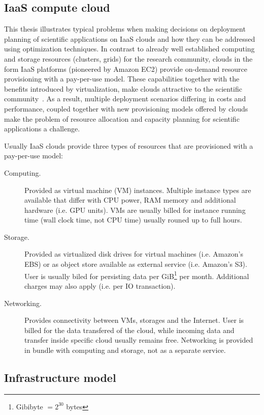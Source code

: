 \subsection{IaaS compute cloud}

This thesis illustrates typical problems when making decisions on deployment planning of scientific applications on IaaS clouds and how they can be addressed using optimization techniques. In contrast to already well established computing and storage resources (clusters, grids) for the research community, clouds in the form IaaS  platforms (pioneered by Amazon EC2) provide on-demand resource provisioning with a pay-per-use model. These capabilities together with the benefits introduced by virtualization, make clouds attractive to the scientific community~\cite{Deelman09}. As a result, multiple deployment scenarios differing in costs and performance, coupled together with new provisioning models offered by clouds make the problem of resource allocation and capacity planning for scientific applications a challenge.

Usually IaaS clouds provide three types of resources that are provisioned with a pay-per-use model: 
\begin{description}
  \item[Computing.] Provided as virtual machine (VM) instances. Multiple instance types are available that differ with CPU power, RAM memory and additional hardware (i.e. GPU units). VMs are usually billed for instance running time (wall clock time, not CPU time) usually rouned up to full hours.
  \item[Storage.] Provided as virtualized disk drives for virtual machines (i.e. Amazon's EBS) or as object store available as external service (i.e. Amazon's S3). User is usually biled for persisting data per GiB\footnote{Gibibyte $= 2^{30}$ bytes} per month. Additional charges may also apply (i.e. per IO transaction).
  \item[Networking.] Provides connectivity between VMs, storages and the Internet. User is billed for the data transfered of the cloud, while incoming data and transfer inside specific cloud usually remains free. Networking is provided in bundle with computing and storage, not as a separate service.
\end{description}

\subsection{Infrastructure model}
\label{sec:intro:cloud:model}

